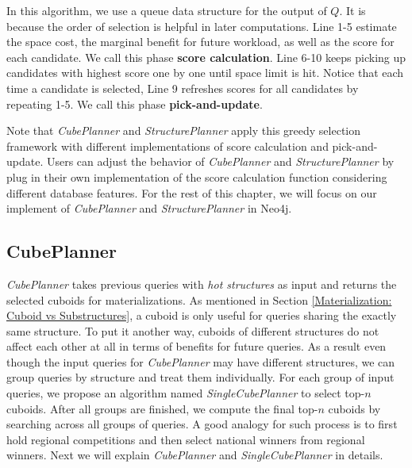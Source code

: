 	In this algorithm, we use a queue data structure for the output of $Q$. It is because the order of selection is helpful in later computations. %
	Line 1-5 estimate the space cost, the marginal benefit for future workload, as well as the score for each candidate. We call this phase  \textbf{score calculation}. Line 6-10 keeps picking up candidates with highest score one by one until space limit is hit. Notice that each time a candidate is selected, Line 9 refreshes scores for all candidates by repeating 1-5. We call this phase \textbf{pick-and-update}.
	
	Note that \emph{CubePlanner} and \emph{StructurePlanner} apply this greedy selection framework with different implementations of score calculation and pick-and-update. Users can adjust the behavior of \emph{CubePlanner} and \emph{StructurePlanner} by plug in their own implementation of the score calculation function considering different database features. For the rest of this chapter, we will focus on our implement of  \emph{CubePlanner} and \emph{StructurePlanner} in Neo4j.
	
	\subsection{CubePlanner}
	\label{sec:CubePlanner}
	
	\emph{CubePlanner} takes previous queries with \emph{hot structures} as input and returns the selected cuboids for materializations. As mentioned in Section \ref{Materialization: Cuboid vs Substructures}, a cuboid is only useful for queries sharing the exactly same structure. To put it another way, cuboids of different structures do not affect each other at all in terms of benefits for future queries. As a result even though the input queries for \emph{CubePlanner} may have different structures, we can group queries by structure and treat them individually. For each group of input queries, we propose an algorithm named \emph{SingleCubePlanner} to select top-$n$ cuboids. After all groups are finished, we compute the final top-$n$ cuboids by searching across all groups of queries. A good analogy for such process is to first hold regional competitions and then select national winners from regional winners. Next we will explain \emph{CubePlanner} and \emph{SingleCubePlanner} in details.
	
